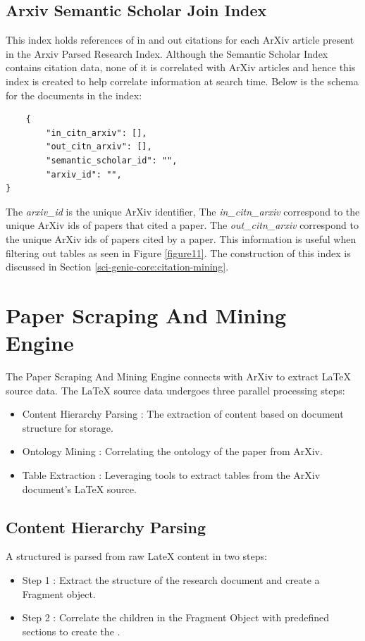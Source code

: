 \subsection{Arxiv Semantic Scholar Join Index}
\label{sci-genie-core:data-layer:ss-join-index}
This index holds references of in and out citations for each ArXiv article present in the Arxiv Parsed Research Index. Although the Semantic Scholar Index contains citation data, none of it is correlated with ArXiv articles and hence this index is created to help correlate information at search time. Below is the schema for the documents in the index: 
\begin{verbatim}
    {
        "in_citn_arxiv": [],
        "out_citn_arxiv": [],
        "semantic_scholar_id": "",
        "arxiv_id": "",
}
\end{verbatim}
The \textit{arxiv\_id} is the unique ArXiv identifier, The \textit{in\_citn\_arxiv} correspond to the unique ArXiv ids of papers that cited a paper. The \textit{out\_citn\_arxiv} correspond to the unique ArXiv ids of papers cited by a paper. This information is useful when filtering out tables as seen in Figure \ref{figure11}. The construction of this index is discussed in Section \ref{sci-genie-core:citation-mining}.
\section{Paper Scraping And Mining Engine}
\label{sci-genie-core:scraping}
The Paper Scraping And Mining Engine connects with ArXiv to extract LaTeX source data. The LaTeX source data undergoes three parallel processing steps:
\begin{itemize}
    \item Content Hierarchy Parsing : The extraction of content based on document structure for storage.
    \item Ontology Mining : Correlating the ontology of the paper from ArXiv.
    \item Table Extraction : Leveraging tools to extract tables from the ArXiv document's LaTeX source.
\end{itemize}

\subsection{Content Hierarchy Parsing}
A structured  is parsed from raw LateX content in two steps:
\begin{itemize}
    \item Step 1 : Extract the structure of the research document and create a Fragment object.
    \item Step 2 : Correlate the children in the Fragment Object with predefined sections to create the .
\end{itemize} 
